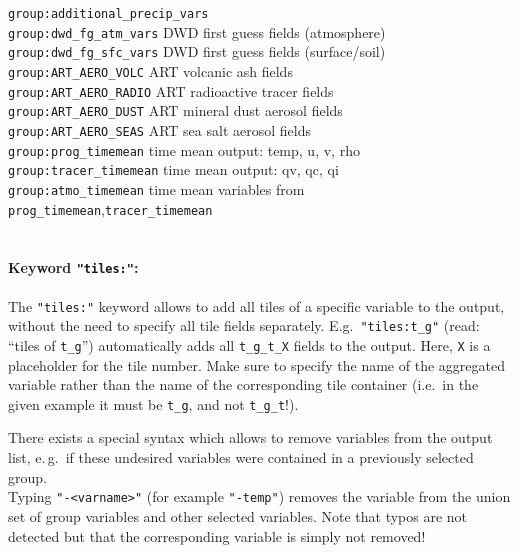 \begin{tabbing}
\texttt{group:additional\_precip\_vars}\>                                                                           \\
\texttt{group:dwd\_fg\_atm\_vars}      \>     DWD first guess fields (atmosphere)                                   \\
\texttt{group:dwd\_fg\_sfc\_vars}      \>     DWD first guess fields (surface/soil)                                 \\
\texttt{group:ART\_AERO\_VOLC}         \>     ART volcanic ash fields                                               \\
\texttt{group:ART\_AERO\_RADIO}        \>     ART radioactive tracer fields                                         \\
\texttt{group:ART\_AERO\_DUST}         \>     ART mineral dust aerosol fields                                       \\
\texttt{group:ART\_AERO\_SEAS}         \>     ART sea salt aerosol fields                                           \\
\texttt{group:prog\_timemean}          \>     time mean output: temp, u, v, rho                                     \\
\texttt{group:tracer\_timemean}        \>     time mean output: qv, qc, qi                                          \\
\texttt{group:atmo\_timemean}          \>     time mean variables from \texttt{prog\_timemean},\texttt{tracer\_timemean}\\                                                  \\
\end{tabbing}

\paragraph{Keyword \texttt{"tiles:"}:}
The \texttt{"tiles:"} keyword allows to add all tiles of a specific variable to the output, without the need to specify all 
tile fields separately. E.g.\ \texttt{"tiles:t\_g"} (read: ``tiles of \texttt{t\_g}'') automatically adds all \texttt{t\_g\_t\_X} 
fields to the output. Here, \texttt{X} is a placeholder for the tile number. Make sure to specify the name of the aggregated 
variable rather than the name of the corresponding tile container (i.e.\ in the given example it must be \texttt{t\_g}, and not 
\texttt{t\_g\_t}!).

\begin{note}
      There exists a special syntax which allows to remove variables from the output list, e.\,g.\ if
      these undesired variables were contained in a previously selected group.\\
      Typing \texttt{"-\textnormal{<varname>}"} (for example \texttt{"-temp"}) removes the
      variable from the union set of group variables and other selected variables.
      Note that typos are not detected but that the corresponding variable is
      simply not removed!
\end{note}

